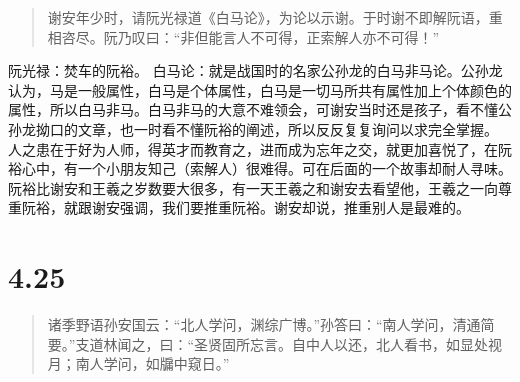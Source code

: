 \documentclass[]{book}
\begin{document}
\begin{quote}
谢安年少时，请阮光禄道《白马论》，为论以示谢。于时谢不即解阮语，重相咨尽。阮乃叹曰：``非但能言人不可得，正索解人亦不可得！''
\end{quote}

阮光禄：焚车的阮裕。
白马论：就是战国时的名家公孙龙的白马非马论。公孙龙认为，马是一般属性，白马是个体属性，白马是一切马所共有属性加上个体颜色的属性，所以白马非马。白马非马的大意不难领会，可谢安当时还是孩子，看不懂公孙龙拗口的文章，也一时看不懂阮裕的阐述，所以反反复复询问以求完全掌握。
人之患在于好为人师，得英才而教育之，进而成为忘年之交，就更加喜悦了，在阮裕心中，有一个小朋友知己（索解人）很难得。可在后面的一个故事却耐人寻味。阮裕比谢安和王羲之岁数要大很多，有一天王羲之和谢安去看望他，王羲之一向尊重阮裕，就跟谢安强调，我们要推重阮裕。谢安却说，推重别人是最难的。

\section{4.25}\label{section-203}

\begin{quote}
诸季野语孙安国云：``北人学问，渊综广博。''孙答曰：``南人学问，清通简要。''支道林闻之，曰：``圣贤固所忘言。自中人以还，北人看书，如显处视月；南人学问，如牖中窥日。''
\end{quote}
\end{document}
